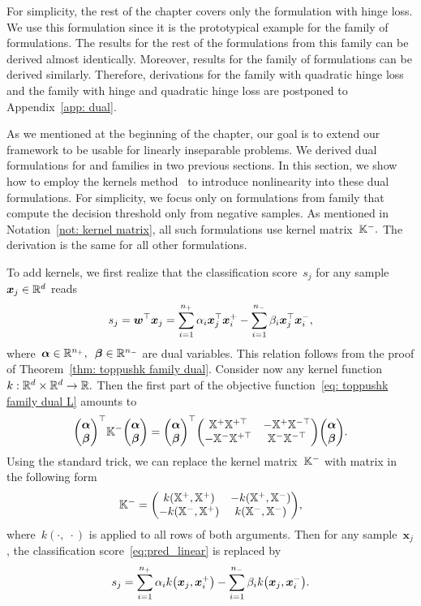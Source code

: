 \begin{note}
  For simplicity, the rest of the chapter covers only the \TopPushK formulation with hinge loss. We use this formulation since it is the prototypical example for the \TopPushK family of formulations. The results for the rest of the formulations from this family can be derived almost identically. Moreover, results for the \PatMat family of formulations can be derived similarly. Therefore, derivations for the \TopPushK family with quadratic hinge loss and the \PatMat family with hinge and quadratic hinge loss are postponed to Appendix~\ref{app: dual}.
\end{note}

As we mentioned at the beginning of the chapter, our goal is to extend our framework to be usable for linearly inseparable problems. We derived dual formulations for \TopPushK and \PatMat families in two previous sections. In this section, we show how to employ the kernels method~\cite{scholkopf2001learning} to introduce nonlinearity into these dual formulations. For simplicity, we focus only on formulations from \TopPushK family that compute the decision threshold only from negative samples. As mentioned in Notation~\ref{not: kernel matrix}, all such formulations use kernel matrix~$\mathbb{K}^{-}.$ The derivation is the same for all other formulations.

To add kernels, we first realize that the classification score~$s_j$ for any sample~$\bm{x}_j \in \mathbb{R}^d$ reads 
\begin{equation}\label{eq:pred_linear}
  s_j
    = \bm{w}^{\top} \bm{x}_j
    = \sum_{i = 1}^{n_{+}} \alpha_i \bm{x}_j^{\top} \bm{x}_i^+ - \sum_{i = 1}^{n_{-}} \beta_i \bm{x}_j^{\top} \bm{x}_i^-,
\end{equation}
where~$\bm{\alpha} \in \mathbb{R}^{n_{+}},$~$\bm{\beta} \in \mathbb{R}^{n_{-}}$ are dual variables. This relation follows from the proof of Theorem~\ref{thm: toppushk family dual}. Consider now any kernel function~$k: \mathbb{R}^d \times \mathbb{R}^d \to \mathbb{R}.$ Then the first part of the objective function~\eqref{eq: toppushk family dual L} amounts to
\begin{equation*}
  \vecab^\top \Kneg \vecab
    = \vecab^\top \Matrix{\X^+ \X^{+\top} & -\X^+ \X^{-\top} \\ -\X^- \X^{+\top} & \X^- \X^{-\top} } \vecab.
\end{equation*}
Using the standard trick, we can replace the kernel matrix~$\mathbb{K}^{-}$ with matrix in the following form
\begin{equation}\label{eq:kernel_nonlinear}
  \Kneg = \Matrix{k\Brac{\X^+, \X^{+}} & -k\Brac{\X^+, \X^{-}} \\ -k\Brac{\X^-, \X^{+}} & k\Brac{\X^-, \X^{-}}},
\end{equation}
where~$k(\cdot,\; \cdot)$ is applied to all rows of both arguments. Then for any sample~$\bm{x}_j$, the classification score~\eqref{eq:pred_linear} is replaced by
\begin{equation}\label{eq: scores dual kernel}
  s_j = \sum_{i = 1}^{\npos} \alpha_i k\Brac{\bm{x}_j, \bm{x}^+_i} - \sum_{i = 1}^{\nneg} \beta_i k\Brac{\bm{x}_j, \bm{x}^-_i}.
\end{equation}

